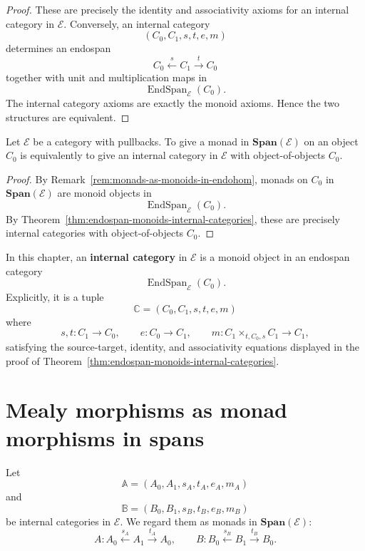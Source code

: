 \begin{proof}
These are precisely the identity and associativity axioms for an internal category in \(\mathcal E\). Conversely, an internal category
\[
(C_0,C_1,s,t,e,m)
\]
determines an endospan
\[
C_0\xleftarrow{s}C_1\xrightarrow{t}C_0
\]
together with unit and multiplication maps in
\[
\operatorname{EndSpan}_{\mathcal E}(C_0).
\]
The internal category axioms are exactly the monoid axioms. Hence the two structures are equivalent.
\end{proof}

\begin{corollary}
\label{cor:monads-in-spans-internal-categories}
Let \(\mathcal E\) be a category with pullbacks. To give a monad in \(\mathbf{Span}(\mathcal E)\) on an object \(C_0\) is equivalently to give an internal category in \(\mathcal E\) with object-of-objects \(C_0\).
\end{corollary}

\begin{proof}
By Remark~\ref{rem:monads-as-monoids-in-endohom}, monads on \(C_0\) in \(\mathbf{Span}(\mathcal E)\) are monoid objects in
\[
\operatorname{EndSpan}_{\mathcal E}(C_0).
\]
By Theorem~\ref{thm:endospan-monoids-internal-categories}, these are precisely internal categories with object-of-objects \(C_0\).
\end{proof}

\begin{definition}
\label{def:internal-category-as-endospan-monoid}
In this chapter, an \textbf{internal category} in \(\mathcal E\) is a monoid object in an endospan category
\[
\operatorname{EndSpan}_{\mathcal E}(C_0).
\]
Explicitly, it is a tuple
\[
\mathbb C=(C_0,C_1,s,t,e,m)
\]
where
\[
s,t:C_1\to C_0,
\qquad
e:C_0\to C_1,
\qquad
m:C_1\times_{t,C_0,s}C_1\to C_1,
\]
satisfying the source-target, identity, and associativity equations displayed in the proof of Theorem~\ref{thm:endospan-monoids-internal-categories}.
\end{definition}

\section{Mealy morphisms as monad morphisms in spans}
\label{sec:mealy-morphisms-as-monad-morphisms}

Let
\[
\mathbb A=(A_0,A_1,s_A,t_A,e_A,m_A)
\]
and
\[
\mathbb B=(B_0,B_1,s_B,t_B,e_B,m_B)
\]
be internal categories in \(\mathcal E\). We regard them as monads in \(\mathbf{Span}(\mathcal E)\):
\[
A:
A_0\xleftarrow{s_A}A_1\xrightarrow{t_A}A_0,
\qquad
B:
B_0\xleftarrow{s_B}B_1\xrightarrow{t_B}B_0.
\]

